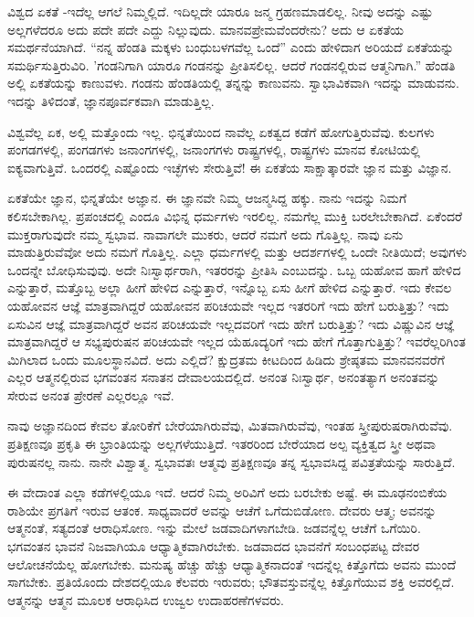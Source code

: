 ವಿಶ್ವದ ಏಕತೆ -ಇದೆಲ್ಲ ಆಗಲೆ ನಿಮ್ಮಲ್ಲಿದೆ. ಇದಿಲ್ಲದೇ ಯಾರೂ ಜನ್ಮ ಗ್ರಹಣಮಾಡಲಿಲ್ಲ. ನೀವು ಅದನ್ನು ಎಷ್ಟು ಅಲ್ಲಗಳೆದರೂ ಅದು ಪದೇ ಪದೇ ಎದ್ದು ನಿಲ್ಲುವುದು. ಮಾನವಪ್ರೇಮವೆಂದರೇನು? ಅದು ಆ ಏಕತೆಯ ಸಮರ್ಥನೆಯಾಗಿದೆ. “ನನ್ನ ಹೆಂಡತಿ ಮಕ್ಕಳು ಬಂಧುಬಳಗವೆಲ್ಲ ಒಂದೆ'' ಎಂದು ಹೇಳಿದಾಗ ಅರಿಯದೆ ಏಕತೆಯನ್ನು ಸಮರ್ಥಿಸುತ್ತಿರುವಿರಿ. 'ಗಂಡನಿಗಾಗಿ ಯಾರೂ ಗಂಡನನ್ನು ಪ್ರೀತಿಸಲಿಲ್ಲ. ಆದರೆ ಗಂಡನಲ್ಲಿರುವ ಆತ್ಮನಿಗಾಗಿ.” ಹೆಂಡತಿ ಅಲ್ಲಿ ಏಕತೆಯನ್ನು ಕಾಣುವಳು. ಗಂಡನು ಹೆಂಡತಿಯಲ್ಲಿ ತನ್ನನ್ನು ಕಾಣುವನು. ಸ್ವಾಭಾವಿಕವಾಗಿ ಇದನ್ನು ಮಾಡುವನು. ಇದನ್ನು ತಿಳಿದಂತೆ, ಜ್ಞಾನಪೂರ್ವಕವಾಗಿ ಮಾಡುತ್ತಿಲ್ಲ.

ವಿಶ್ವವೆಲ್ಲ ಏಕ, ಅಲ್ಲಿ ಮತ್ತೊಂದು ಇಲ್ಲ. ಭಿನ್ನತೆಯಿಂದ ನಾವೆಲ್ಲ ಏಕತ್ವದ ಕಡೆಗೆ ಹೋಗುತ್ತಿರುವೆವು. ಕುಲಗಳು ಪಂಗಡಗಳಲ್ಲಿ, ಪಂಗಡಗಳು ಜನಾಂಗಗಳಲ್ಲಿ, ಜನಾಂಗಗಳು ರಾಷ್ಟ್ರಗಳಲ್ಲಿ, ರಾಷ್ಟ್ರಗಳು ಮಾನವ ಕೋಟಿಯಲ್ಲಿ ಐಕ್ಯವಾಗುತ್ತಿವೆ. ಒಂದರಲ್ಲಿ ಎಷ್ಟೊಂದು ಇಚ್ಛೆಗಳು ಸೇರುತ್ತಿವೆ! ಈ ಏಕತೆಯ ಸಾಕ್ಷಾತ್ಕಾರವೇ ಜ್ಞಾನ ಮತ್ತು ವಿಜ್ಞಾನ.

ಏಕತೆಯೇ ಜ್ಞಾನ, ಭಿನ್ನತೆಯೇ ಅಜ್ಞಾನ. ಈ ಜ್ಞಾನವೇ ನಿಮ್ಮ ಆಜನ್ಮಸಿದ್ದ ಹಕ್ಕು. ನಾನು ಇದನ್ನು ನಿಮಗೆ ಕಲಿಸಬೇಕಾಗಿಲ್ಲ. ಪ್ರಪಂಚದಲ್ಲಿ ಎಂದೂ ವಿಭಿನ್ನ ಧರ್ಮಗಳು ಇರಲಿಲ್ಲ. ನಮಗೆಲ್ಲ ಮುಕ್ತಿ ಬರಲೇಬೇಕಾಗಿದೆ. ಏಕೆಂದರೆ ಮುಕ್ತರಾಗುವುದೇ ನಮ್ಮ ಸ್ವಭಾವ. ನಾವಾಗಲೇ ಮುಕರು, ಆದರೆ ನಮಗೆ ಅದು ಗೊತ್ತಿಲ್ಲ. ನಾವು ಏನು ಮಾಡುತ್ತಿರುವೆವೋ ಅದು ನಮಗೆ ಗೊತ್ತಿಲ್ಲ. ಎಲ್ಲಾ ಧರ್ಮಗಳಲ್ಲಿ ಮತ್ತು ಆದರ್ಶಗಳಲ್ಲಿ ಒಂದೇ ನೀತಿಯಿದೆ; ಅವುಗಳು ಒಂದನ್ನೇ ಬೋಧಿಸುವುವು. ಅದೇ ನಿಃಸ್ವಾರ್ಥರಾಗಿ, ಇತರರನ್ನು ಪ್ರೀತಿಸಿ ಎಂಬುದನ್ನು. ಒಬ್ಬ ಯಹೋವ ಹಾಗೆ ಹೇಳಿದ ಎನ್ನುತ್ತಾರೆ, ಮತ್ತೊಬ್ಬ ಅಲ್ಲಾ ಹೀಗೆ ಹೇಳಿದ ಎನ್ನುತ್ತಾರೆ, ಇನ್ನೊಬ್ಬ ಏಸು ಹೀಗೆ ಹೇಳಿದ ಎನ್ನುತ್ತಾರೆ. ಇದು ಕೇವಲ ಯಹೋವನ ಆಜ್ಞೆ ಮಾತ್ರವಾಗಿದ್ದರೆ ಯಹೋವನ ಪರಿಚಯವೇ ಇಲ್ಲದ ಇತರರಿಗೆ ಇದು ಹೇಗೆ ಬರುತ್ತಿತ್ತು? ಇದು ಏಸುವಿನ ಆಜ್ಞೆ ಮಾತ್ರವಾಗಿದ್ದರೆ ಅವನ ಪರಿಚಯವೇ ಇಲ್ಲದವರಿಗೆ ಇದು ಹೇಗೆ ಬರುತ್ತಿತ್ತು? ಇದು ವಿಷ್ಣುವಿನ ಆಜ್ಞೆ ಮಾತ್ರವಾಗಿದ್ದರೆ ಆ ಸಭ್ಯಪುರುಷನ ಪರಿಚಯವೇ ಇಲ್ಲದ ಯೆಹೂದ್ಯರಿಗೆ ಇದು ಹೇಗೆ ಗೊತ್ತಾಗುತ್ತಿತ್ತು? ಇವರೆಲ್ಲರಿಗಿಂತ ಮಿಗಿಲಾದ ಒಂದು ಮೂಲಸ್ಥಾನವಿದೆ. ಅದು ಎಲ್ಲಿದೆ? ಕ್ಷುದ್ರತಮ ಕೀಟದಿಂದ ಹಿಡಿದು ಶ್ರೇಷ್ಠತಮ ಮಾನವನವರೆಗೆ ಎಲ್ಲರ ಆತ್ಮನಲ್ಲಿರುವ ಭಗವಂತನ ಸನಾತನ ದೇವಾಲಯದಲ್ಲಿದೆ. ಅನಂತ ನಿಃಸ್ವಾರ್ಥ, ಅನಂತತ್ಯಾಗ ಅನಂತವನ್ನು ಸೇರುವ ಅನಂತ ಪ್ರೇರಣೆ ಎಲ್ಲರಲ್ಲೂ ಇವೆ.

ನಾವು ಅಜ್ಞಾನದಿಂದ ಕೇವಲ ತೋರಿಕೆಗೆ ಬೇರೆಯಾಗಿರುವೆವು, ಮಿತವಾಗಿರುವೆವು, ಇಂತಹ ಸ್ತ್ರೀಪುರುಷರಾಗಿರುವೆವು. ಪ್ರತಿಕ್ಷಣವೂ ಪ್ರಕೃತಿ ಈ ಭ್ರಾಂತಿಯನ್ನು ಅಲ್ಲಗಳೆಯುತ್ತಿದೆ. ಇತರರಿಂದ ಬೇರೆಯಾದ ಅಲ್ಪ ವ್ಯಕ್ತಿತ್ವದ ಸ್ತ್ರೀ ಅಥವಾ ಪುರುಷನಲ್ಲ ನಾನು. ನಾನೇ ವಿಶ್ವಾತ್ಮ. ಸ್ವಭಾವತಃ ಆತ್ಮವು ಪ್ರತಿಕ್ಷಣವೂ ತನ್ನ ಸ್ವಭಾವಸಿದ್ದ ಪವಿತ್ರತೆಯನ್ನು ಸಾರುತ್ತಿದೆ.

ಈ ವೇದಾಂತ ಎಲ್ಲಾ ಕಡೆಗಳಲ್ಲಿಯೂ ಇದೆ. ಆದರೆ ನಿಮ್ಮ ಅರಿವಿಗೆ ಅದು ಬರಬೇಕು ಅಷ್ಟೆ. ಈ ಮೂಢನಂಬಿಕೆಯ ರಾಶಿಯೇ ಪ್ರಗತಿಗೆ ಇರುವ ಆತಂಕ. ಸಾಧ್ಯವಾದರೆ ಅವನ್ನು ಆಚೆಗೆ ಒಗೆದುಬಿಡೋಣ. ದೇವರು ಆತ್ಮ; ಅವನನ್ನು ಆತ್ಮನಂತೆ, ಸತ್ಯದಂತೆ ಆರಾಧಿಸೋಣ. ಇನ್ನು ಮೇಲೆ ಜಡವಾದಿಗಳಾಗಬೇಡಿ. ಜಡವನ್ನೆಲ್ಲ ಆಚೆಗೆ ಒಗೆಯಿರಿ. ಭಗವಂತನ ಭಾವನೆ ನಿಜವಾಗಿಯೂ ಆಧ್ಯಾತ್ಮಿಕವಾಗಿರಬೇಕು. ಜಡವಾದದ ಭಾವನೆಗೆ ಸಂಬಂಧಪಟ್ಟ ದೇವರ ಆಲೋಚನೆಯೆಲ್ಲ ಹೋಗಬೇಕು. ಮನುಷ್ಯ ಹೆಚ್ಚು ಹೆಚ್ಚು ಆಧ್ಯಾತ್ಮಿಕನಾದಂತೆ ಇದನ್ನೆಲ್ಲ ಕಿತ್ತೊಗೆದು ಅವನು ಮುಂದೆ ಸಾಗಬೇಕು. ಪ್ರತಿಯೊಂದು ದೇಶದಲ್ಲಿಯೂ ಕೆಲವರು ಇರುವರು; ಭೌತವಸ್ತುವನ್ನೆಲ್ಲ ಕಿತ್ತೊಗೆಯುವ ಶಕ್ತಿ ಅವರಲ್ಲಿದೆ. ಆತ್ಮನನ್ನು ಆತ್ಮನ ಮೂಲಕ ಆರಾಧಿಸಿದ ಉಜ್ವಲ ಉದಾಹರಣೆಗಳವರು.


